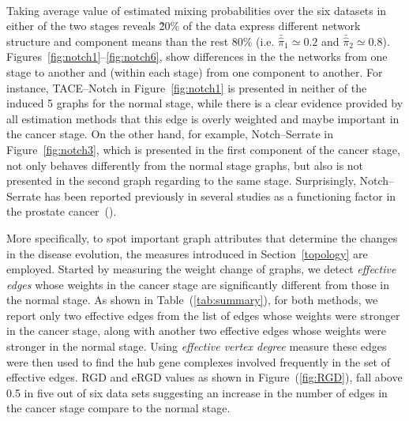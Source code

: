 \documentclass[10pt]{article}
\newcommand{\red}[1]{{\textcolor {red} {#1}}}
\begin{document}
\\




Taking average value of estimated mixing probabilities over the six datasets in either of the two stages reveals  \~20\% of the data express different network structure and component means than the rest 80\% (i.e. $\bar{\hat{\pi}}_1 \simeq 0.2$ and $\bar{\hat{\pi}}_2 \simeq 0.8$). %
Figures~\ref{fig:notch1}--\ref{fig:notch6}, show differences in the the networks from one stage to another and (within each stage) from one component to another. For instance, TACE--Notch in Figure~\ref{fig:notch1} is presented in neither of the induced 5 graphs for the normal stage, while there is a clear evidence provided by all estimation methods that this edge is overly weighted and maybe important in the cancer stage. On the other hand, for example, Notch--Serrate in Figure~\ref{fig:notch3}, which is presented in the first component of the cancer stage,  not only behaves differently from the normal stage graphs, but also is not presented in the second graph regarding to the same stage. Surprisingly, Notch--Serrate has been reported previously in several studies as a functioning factor in the prostate cancer~(\cite{zhu2013elevated,carvalho2014notch}).



More specifically, to spot important graph attributes that determine the changes in the disease evolution, the measures introduced in Section~\ref{topology} are employed. Started by measuring the weight change of graphs, we detect \textit{effective edges} whose weights in the cancer stage are significantly different from those in the normal stage.  As shown in Table~(\ref{tab:summary}), for both methods,  we report only two  effective edges from the list of edges whose weights were stronger in the cancer stage, along with another  two effective edges whose weights were stronger in the normal stage. Using \textit{effective vertex degree} measure these edges were then used to find the hub gene complexes involved frequently in the set of effective edges. RGD and eRGD values as shown in Figure~(\ref{fig:RGD}), fall above 0.5 in five out of six data sets suggesting an increase in the number of edges in the cancer stage compare to the normal stage. %
\end{document}
